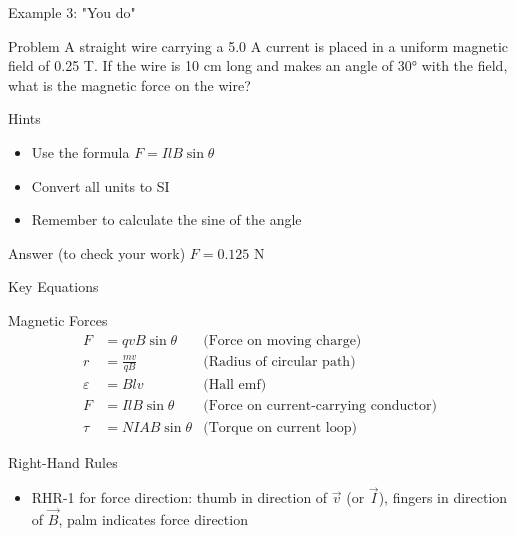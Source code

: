 \documentclass{beamer}
\begin{document}
\begin{frame}{Example 3: "You do"}
\begin{block}{Problem}
A straight wire carrying a 5.0 A current is placed in a uniform magnetic field of 0.25 T. If the wire is 10 cm long and makes an angle of 30° with the field, what is the magnetic force on the wire?
\end{block}
\pause
\begin{block}{Hints}
\begin{itemize}
\item Use the formula $F = IlB\sin\theta$
\item Convert all units to SI
\item Remember to calculate the sine of the angle
\end{itemize}
\end{block}
\pause
\begin{block}{Answer (to check your work)}
$F = 0.125$ N
\end{block}
\end{frame}

\begin{frame}{Key Equations}
\begin{block}{Magnetic Forces}
\begin{align}
F &= qvB\sin\theta & \text{(Force on moving charge)} \\
r &= \frac{mv}{qB} & \text{(Radius of circular path)} \\
\varepsilon &= Blv & \text{(Hall emf)} \\
F &= IlB\sin\theta & \text{(Force on current-carrying conductor)} \\
\tau &= NIAB\sin\theta & \text{(Torque on current loop)}
\end{align}
\end{block}

\begin{block}{Right-Hand Rules}
\begin{itemize}
\item RHR-1 for force direction: thumb in direction of $\vec{v}$ (or $\vec{I}$), fingers in direction of $\vec{B}$, palm indicates force direction
\end{itemize}
\end{block}
\end{frame}
\end{document}

